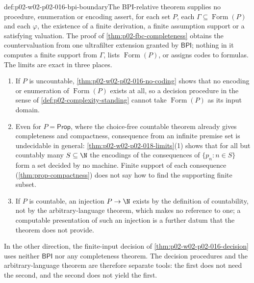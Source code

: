 \begin{proofboundary}{def:p02-w02-p02-016-bpi-boundary}{The BPI-relative theorem supplies no procedure, enumeration or encoding}
 assert, for each set \(P\), each
\(\Gamma\subseteq\operatorname{Form}(P)\) and each \(\varphi\), the existence
of a finite derivation, a finite assumption support or a satisfying valuation.
The proof of \cref{thm:p02-fbc-completeness} obtains the countervaluation from
one ultrafilter extension granted by \(\mathsf{BPI}\); nothing in it computes
a finite support from \(\Gamma\), lists \(\operatorname{Form}(P)\), or assigns
codes to formulas.  The limits are exact in three places.
\begin{enumerate}
\item If \(P\) is uncountable, \cref{thm:p02-w02-p02-016-no-coding} shows
      that no encoding or enumeration of \(\operatorname{Form}(P)\) exists at
      all, so a decision procedure in the sense of
      \cref{def:p02-complexity-standing} cannot take
      \(\operatorname{Form}(P)\) as its input domain.
\item Even for \(P=\mathsf{Prop}\), where the choice-free countable theorem
      already gives completeness and compactness, consequence from an infinite
      premise set is undecidable in general:
      \cref{thm:p02-w02-p02-018-limits}(1) shows that for all but countably
      many \(S\subseteq\N\) the encodings of the consequences of
      \(\{p_n:n\in S\}\) form a set decided by no machine.  Finite support of each
      consequence (\cref{thm:prop-compactness}) does not say how to find the
      supporting finite subset.
\item If \(P\) is countable, an injection \(P\to\N\) exists by the definition
      of countability, not by the arbitrary-language theorem, which makes no
      reference to one; a computable presentation of such an injection is a
      further datum that the theorem does not provide.
\end{enumerate}
In the other direction, the finite-input decision of
\cref{thm:p02-w02-p02-016-decision} uses neither \(\mathsf{BPI}\) nor any
completeness theorem.  The decision procedures and the arbitrary-language
theorem are therefore separate tools: the first does not need the second,
and the second does not yield the first.
\end{proofboundary}

